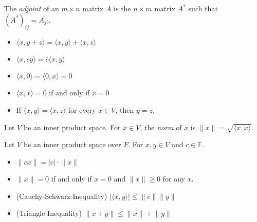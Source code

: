 \documentclass[12pt]{article}
\newenvironment{theorem}[2][Theorem]{\begin{trivlist}
\item[\hskip \labelsep {\bfseries #1}\hskip \labelsep {\bfseries #2.}]}{\end{trivlist}}
\newenvironment{definition}[2][Definition]{\begin{trivlist}
\item[\hskip \labelsep {\bfseries #1}\hskip \labelsep {\bfseries #2}]}{\end{trivlist}}
\begin{document}
\begin{definition}{2}
The \textit{adjoint} of an $m \times n$ matrix $A$ is the $n \times m$ matrix $A^*$ such that $(A^*)_{ij} = \overline{A_{ji}}$.
\end{definition}

\begin{theorem}{6.1} \text{ }
\begin{itemize}
    \item $\langle x, y + z \rangle = \langle x, y \rangle + \langle x, z \rangle$
    
    \item $\langle x, cy \rangle = \overline{c}\langle x, y \rangle$
    
    \item $\langle x, 0 \rangle = \langle 0, x \rangle = 0$
    
    \item $\langle x, x \rangle = 0$ if and only if $x = 0$
    
    \item If $\langle x, y \rangle = \langle x, z \rangle$ for every $x \in V$, then $y = z$.
\end{itemize}
\end{theorem}

\begin{definition}{3}
Let $V$ be an inner product space. For $x \in V$, the \textit{norm} of $x$ is $\lVert x \rVert = \sqrt{\langle x, x \rangle}$.
\end{definition}

\begin{theorem}{6.2}
Let $V$ be an inner product space over $F$. For $x,y \in V$ and $c \in \mathbb{F}$.

\begin{itemize}
    \item[(a)] $\lVert cx \rVert = |c| \cdot \lVert x \rVert$
    
    \item[(b)] $\lVert x \rVert = 0$ if and only if $x = 0$ and $\lVert x \rVert \geq 0$ for any $x$.
    
    \item[(c)] (Cauchy-Schwarz Inequality) $\lvert \langle x, y \rangle \rvert \leq \lVert c \rVert \lVert y \rVert$
    
    \item[(d)] (Triangle Inequality) $\lVert x + y \rVert \leq \lVert x \rVert + \lVert y \rVert$
\end{itemize}
\end{theorem}
\end{document}
